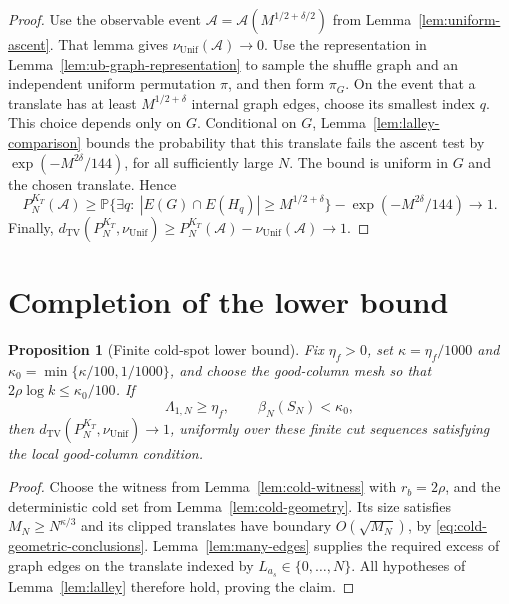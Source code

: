 \documentclass[11pt]{article}
\numberwithin{equation}{section}
\newtheorem{proposition}[proposition]{Proposition}
\newcommand{\TV}{\mathrm{TV}}
\newcommand{\Unif}{\mathrm{Unif}}
\newcommand{\Pp}{\mathbb P}
\newcommand{\1}{\mathbf 1}
\newcommand{\nuUnif}{\nu_{\Unif}}
\begin{document}
\begin{proof}
Use the observable event
\(\mathcal A=\mathcal A(M^{1/2+\delta/2})\) from
Lemma~\ref{lem:uniform-ascent}.  That lemma gives
\(\nuUnif(\mathcal A)\to0\).
Use the representation in Lemma~\ref{lem:ub-graph-representation}
to sample the shuffle graph and an independent uniform permutation
\(\pi\), and then form \(\pi_G\).
On the event that a translate has at least
\(M^{1/2+\delta}\) internal graph edges, choose its smallest index
\(q\).  This choice depends only on \(G\).
Conditional on \(G\), Lemma~\ref{lem:lalley-comparison} bounds the
probability that this translate fails the ascent test by
\(\exp(-M^{2\delta}/144)\), for all sufficiently large \(N\).
The bound is uniform in \(G\) and the chosen translate.  Hence
\[
  P_N^{K_T}(\mathcal A)
  \ge
  \Pp\{\exists q:\ |E(G)\cap E(H_q)|\ge M^{1/2+\delta}\}
     -\exp(-M^{2\delta}/144)
  \longrightarrow1.
\]
Finally,
\(d_{\TV}(P_N^{K_T},\nuUnif)
\ge P_N^{K_T}(\mathcal A)-\nuUnif(\mathcal A)\to1\).
\end{proof}
\section{Completion of the lower bound}
\label{sec:completion-matching-lower-bound}

\begin{proposition}[Finite cold-spot lower bound]
\label{prop:cold-lower}
Fix $\eta_f>0$, set $\kappa=\eta_f/1000$ and
$\kappa_0=\min\{\kappa/100,1/1000\}$, and choose the good-column mesh
so that $2\rho\log k\le\kappa_0/100$. If
\[
 \Lambda_{1,N}\ge\eta_f,\qquad \beta_N(S_N)<\kappa_0,
\]
then $d_{\TV}(P_N^{K_T},\nuUnif)\to1$, uniformly over these finite
cut sequences satisfying the local good-column condition.
\end{proposition}

\begin{proof}
Choose the witness from Lemma~\ref{lem:cold-witness} with $r_b=2\rho$,
and the deterministic cold set from Lemma~\ref{lem:cold-geometry}.
Its size satisfies $M_N\ge N^{\kappa/3}$ and its clipped translates
have boundary $O(\sqrt{M_N})$, by \eqref{eq:cold-geometric-conclusions}.
Lemma~\ref{lem:many-edges} supplies the required excess of graph edges
on the translate indexed by $L_{a_s}\in\{0,\ldots,N\}$.
All hypotheses of Lemma~\ref{lem:lalley} therefore hold, proving the claim.
\end{proof}
\end{document}
